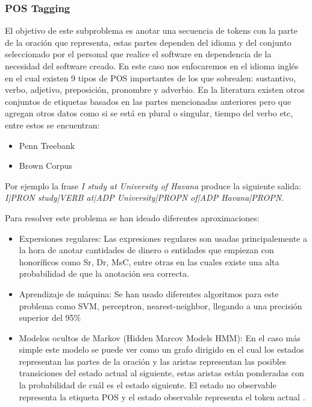 \documentclass[runningheads]{llncs}
\begin{document}
\subsubsection{POS Tagging}

El objetivo de este subproblema es anotar una secuencia de tokens con la parte de la oración que representa, estas partes dependen del idioma y del conjunto seleccionado por el personal que realice el software en dependencia de la necesidad del software creado. En este caso nos enfocaremos en el idioma inglés en el cual existen 9 tipos de POS importantes de los que sobrealen: sustantivo, verbo, adjetivo, preposición, pronombre y adverbio. En la literatura existen otros conjuntos de etiquetas basados en las partes mencionadas anteriores pero que agregan otros datos como si se está en plural o singular, tiempo del verbo etc, entre estos se encuentran:

\begin{itemize}
\item Penn Treebank \cite{pennpostag}
\item Brown Corpus \cite{brownpostag}
\end{itemize}

Por ejemplo la frase \emph{I study at University of Havana} produce la siguiente salida: \emph{I|PRON study|VERB at|ADP University|PROPN of|ADP Havana|PROPN}.

Para resolver este problema se han ideado diferentes aproximaciones:

\begin{itemize}

\item Expersiones regulares: Las expresiones regulares son usadas principalemente a la hora de anotar cantidades de dinero o entidades que empiezan con honoríficos como Sr, Dr, MsC, entre otras en las cuales existe una alta probabilidad de que la anotación sea correcta.

\item Aprendizaje de máquina: Se han usado diferentes algoritmos para este problema como SVM, perceptron, nearest-neighbor, llegando a una precisión superior del 95\% \cite{postag}

\item Modelos ocultos de Markov (Hidden Marcov Models HMM): En el caso más simple este modelo se puede ver como un grafo dirigido en el cual los estados representan las partes de la oración y las aristas representan las posibles transiciones del estado actual al siguiente, estas aristas están ponderadas con la probabilidad de cuál es el estado siguiente. El estado no observable representa la etiqueta POS y el estado observable representa el token actual \cite{hmm}.

\end{itemize}
\end{document}
